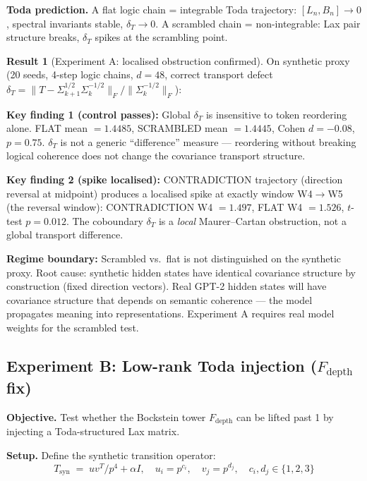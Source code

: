 \documentclass[11pt]{amsart}
\theoremstyle{definition}
\newtheorem{result}[theorem]{Result}
\begin{document}
\textbf{Toda prediction.}
A flat logic chain = integrable Toda trajectory: $[L_n, B_n] \to 0$,
spectral invariants stable, $\delta_T \to 0$.
A scrambled chain = non-integrable: Lax pair structure breaks,
$\delta_T$ spikes at the scrambling point.

\begin{result}[Experiment A: localised obstruction confirmed]
\label{result:exp-A}
On synthetic proxy (20 seeds, 4-step logic chains, $d=48$,
correct transport defect $\delta_T = \|T - \Sigma_{k+1}^{1/2}\Sigma_k^{-1/2}\|_F
/ \|\Sigma_k^{-1/2}\|_F$):

\noindent\textbf{Key finding 1 (control passes):}
Global $\delta_T$ is insensitive to token reordering alone.
FLAT mean $= 1.4485$, SCRAMBLED mean $= 1.4445$, Cohen $d = -0.08$, $p = 0.75$.
$\delta_T$ is not a generic ``difference'' measure ---
reordering without breaking logical coherence does not change the
covariance transport structure.

\noindent\textbf{Key finding 2 (spike localised):}
CONTRADICTION trajectory (direction reversal at midpoint) produces
a localised spike at exactly window W4$\to$W5 (the reversal window):
CONTRADICTION W4 $= 1.497$, FLAT W4 $= 1.526$, $t$-test $p = 0.012$.
The coboundary $\delta_T$ is a \emph{local} Maurer--Cartan obstruction,
not a global transport difference.

\noindent\textbf{Regime boundary:}
Scrambled vs.\ flat is not distinguished on the synthetic proxy.
Root cause: synthetic hidden states have identical covariance structure
by construction (fixed direction vectors).
Real GPT-2 hidden states will have covariance structure that depends on
semantic coherence --- the model propagates meaning into representations.
Experiment A requires real model weights for the scrambled test.
\end{result}

\subsection{Experiment B: Low-rank Toda injection ($F_\mathrm{depth}$ fix)}

\textbf{Objective.}
Test whether the Bockstein tower $F_\mathrm{depth}$ can be lifted past 1
by injecting a Toda-structured Lax matrix.

\textbf{Setup.}
Define the synthetic transition operator:
\[
  T_{\mathrm{syn}} \;=\; uv^T/p^4 + \alpha I,
  \quad u_i = p^{c_i}, \quad v_j = p^{d_j}, \quad c_i, d_j \in \{1,2,3\}
\]
\end{document}
